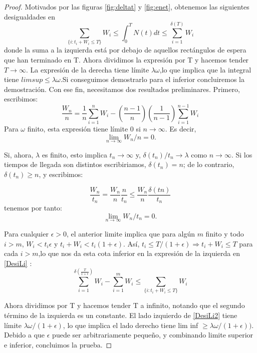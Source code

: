 \documentclass[a4paper,10pt]{scrartcl}
\theoremstyle{definition}
\numberwithin{equation}{section}
\begin{document}
\begin{proof}
Motivados por las figuras \ref{fig:deltat} y \ref{fig:enet}, obtenemos las siguientes desigualdades en
\begin{equation}
 \sum_{\{i:t_i+W_i\leq T\}}^{} W_i\leq\int_{0}^{T}N(t)dt\leq \sum_{i=1}^{\delta(T)} W_i
 \label{DesiLi}
 \end{equation}
donde la suma a la izquierda está por debajo de aquellos rectángulos de espera que han terminado en T.
Ahora dividimos la expresión por T y hacemos tender $T\rightarrow\infty$. La expresión de la derecha tiene límite $\lambda\omega$,lo que implica que la integral tiene $lim sup \leq \lambda\omega$.Si conseguimos demostrarlo para el inferior concluiremos la demostración. Con ese fin, necesitamos dos resultados preliminares. Primero, escribimos:
\[ \frac{W_n}{n}=\frac{1}{n}\sum_{i=1}^{n}W_i-(\frac{n-1}{n})(\frac{1}{n-1})\sum_{i=1}^{n-1}W_i \]
Para $\omega$ finito, esta expresión tiene límite 0 si $n \rightarrow \infty$. Es decir,
\[ \lim_{n\to\infty} W_n / n = 0. \]

Si, ahora, $\lambda$ es finito, esto implica $t_n \rightarrow \infty$ y, $\delta(t_n)/t_n \rightarrow  \lambda$ como $n \rightarrow \infty$. Si los tiempos de llegada son distintos escribiriamos, $\delta(t_n)=n$; de lo contrario, $\delta(t_n)\geq n$, y escribimos:

\[ \frac{W_n }{t_n} = \frac{W_n }{n}\frac{n }{t_n}\leq \frac{W_n }{n}\frac{\delta(tn)}{t_n} \]
 tenemos por tanto:
 \[ \lim_{n\to\infty} W_n / t_n = 0. \]

Para cualquier $\epsilon> 0$, el anterior limite implica que para algún $m$ finito y todo $i> m$, $W_i <t_i\epsilon$ y $t_i + W_i <t_i (1 + \epsilon)$. Así, $t_i \leq T / (1 + \epsilon) \Longrightarrow t_i + W_i \leq T$ para cada $i> m$,lo que nos da esta cota inferior en la expresión de la izquierda en \ref{DesiLi} :
\begin{equation}\sum_{i=1}^{\delta(\frac{T}{1+\epsilon})} W_i-\sum_{i=1}^{m} W_i\leq \sum_{\{i:t_i+W_i\leq T\}}^{} W_i
\label{DesiLi2}
\end{equation}

Ahora dividimos por T y hacemos tender T a infinito, notando que el segundo término de la izquierda es un
constante. El lado izquierdo de \ref{DesiLi2} tiene límite $ \lambda\omega / (1 + \epsilon)$, lo que implica el lado derecho tiene lim inf $\geq \lambda\omega / (1 + \epsilon))$. Debido a que $\epsilon$ puede ser arbitrariamente pequeño, y combinando limite superior e inferior, concluimos la prueba.
\end{proof}
  
\end{document}
